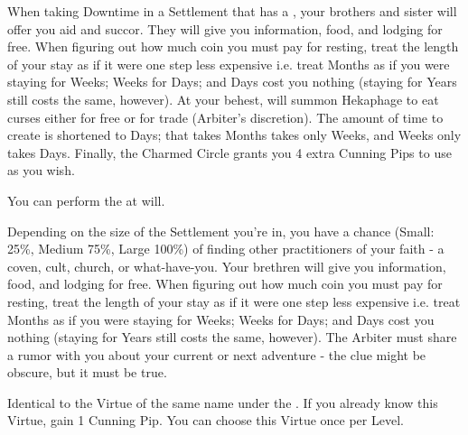 \begin{multicols*}{2}





When taking Downtime in a Settlement that has a , your brothers and sister will offer you aid and succor. They will give you information, food, and lodging for free. When figuring out how much coin you must pay for resting, treat the length of your stay as if it were one step less expensive i.e. treat Months as if you were staying for Weeks; Weeks for Days; and Days cost you nothing (staying for Years still costs the same, however). At your behest,  will summon Hekaphage to eat curses either for free or for trade (Arbiter's discretion). The amount of time to create  is shortened to Days;  that takes Months takes only Weeks, and Weeks only takes Days.  Finally, the Charmed Circle grants you 4 extra Cunning Pips to use as you wish.


You can perform the  at will.

\cbreak


Depending on the size of the Settlement you're in, you have a chance (Small: 25\%, Medium 75\%, Large 100\%) of finding other practitioners of your faith - a coven, cult, church, or what-have-you.  Your brethren will give you information, food, and lodging for free. When figuring out how much coin you must pay for resting, treat the length of your stay as if it were one step less expensive i.e. treat Months as if you were staying for Weeks; Weeks for Days; and Days cost you nothing (staying for Years still costs the same, however). The Arbiter must share a rumor with you about your current or next adventure - the clue might be obscure, but it must be true.


Identical to the Virtue of the same name under the . If you already know this Virtue, gain 1 Cunning Pip. You can choose this Virtue once per Level.




\end{multicols*}
